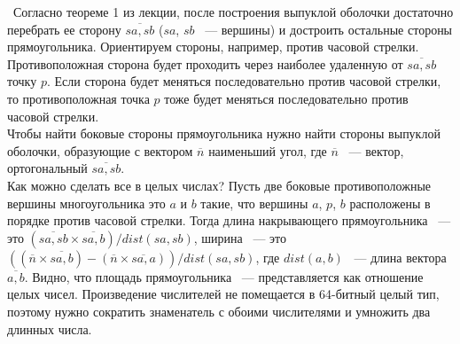 \indent\indent\ Согласно теореме 1 из лекции,
после построения выпуклой оболочки
достаточно перебрать ее сторону $\overline{sa,sb}$
($sa$, $sb$ ~--- вершины) и достроить остальные стороны
прямоугольника. Ориентируем стороны, например,
против часовой стрелки. Противоположная сторона будет проходить
через наиболее удаленную от $\overline{sa,sb}$ точку $p$.
Если сторона будет меняться
последовательно против часовой стрелки, то противоположная точка $p$ тоже
будет меняться последовательно против часовой стрелки.\\
Чтобы найти боковые стороны прямоугольника нужно найти стороны
выпуклой оболочки, образующие с вектором $\overline{n}$ наименьший угол,
где $\overline{n}$ ~--- вектор, ортогональный $\overline{sa,sb}$.\\

Как можно сделать все в целых числах? Пусть две боковые
противоположные вершины многоугольника это $a$ и $b$ такие,
что вершины $a$, $p$, $b$ расположены в порядке против часовой
стрелки. Тогда длина накрывающего прямоугольника ~---
это $(\overline{sa,sb} \times \overline{sa,b}) / dist(sa, sb)$,
ширина ~--- это
$((\overline{n} \times \overline{sa,b})
- (\overline{n} \times \overline{sa,a})) / dist(sa, sb)$,
где $dist(a, b)$ ~--- длина вектора $\overline{a,b}$. Видно, что
площадь прямоугольника ~--- представляется как отношение
целых чисел. Произведение числителей не помещается в 64-битный
целый тип, поэтому нужно сократить знаменатель с обоими числителями
и умножить два длинных числа.
